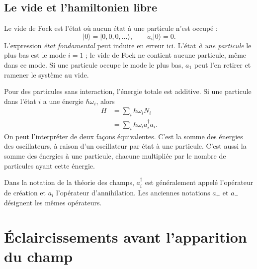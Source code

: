 \subsection{Le vide et l’hamiltonien libre}

Le vide de Fock est l’état où aucun état à une particule n’est occupé :
\begin{equation}
|0\rangle=|0,0,0,\ldots\rangle,
\qquad a_i|0\rangle=0.
\end{equation}
L’expression \emph{état fondamental} peut induire en erreur ici. L’état \emph{à une particule} le plus bas est le mode \(i=1\) ; le vide de Fock ne contient aucune particule, même dans ce mode. Si une particule occupe le mode le plus bas, \(a_1\) peut l’en retirer et ramener le système au vide.

\begin{classroomqa}\end{classroomqa}

Pour des particules sans interaction, l’énergie totale est additive. Si une particule dans l’état \(i\) a une énergie \(\hbar\omega_i\), alors
\begin{align}
H
&=\sum_i \hbar\omega_i N_i \\
&=\sum_i \hbar\omega_i a_i^\dagger a_i.
\label{eq:l06-free-fock-hamiltonian}
\end{align}
On peut l’interpréter de deux façons équivalentes. C’est la somme des énergies des oscillateurs, à raison d’un oscillateur par état à une particule. C’est aussi la somme des énergies à une particule, chacune multipliée par le nombre de particules ayant cette énergie.

Dans la notation de la théorie des champs, \(a_i^\dagger\) est généralement appelé l’opérateur de création et \(a_i\) l’opérateur d’annihilation. Les anciennes notations \(a_+\) et \(a_-\) désignent les mêmes opérateurs.

\section{Éclaircissements avant l’apparition du champ}

